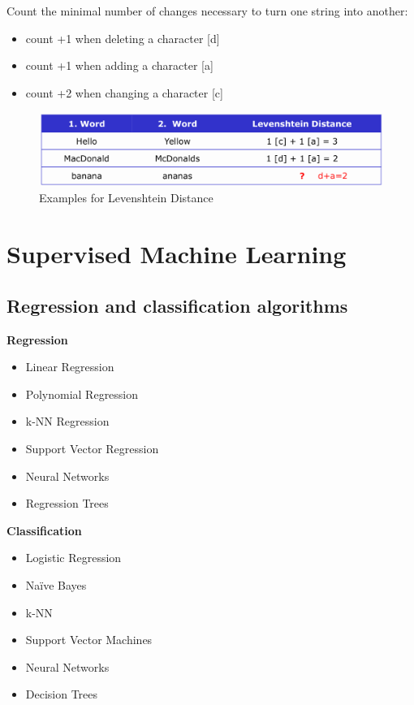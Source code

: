 \documentclass[a4paper, 11pt]{article}
\begin{document}
Count the minimal number of changes necessary to turn one string into another:
\begin{itemize}
    \item count +1 when deleting a character [d]
    \item count +1 when adding a character [a]
    \item count +2 when changing a character [c]
\end{itemize}

\begin{figure}[htb!]
    \centering
    \includegraphics[keepaspectratio=true, width=\linewidth]{levenshtein.png}
    \caption{Examples for Levenshtein Distance}
    \label{fig:levenshtein}
\end{figure}

\newpage

\section{Supervised Machine Learning}

\subsection{Regression and classification algorithms}

\begin{multicols}{2}
    \textbf{Regression}
    \begin{itemize}
        \item Linear Regression
        \item Polynomial Regression
        \item k-NN Regression
        \item Support Vector Regression
        \item Neural Networks
        \item Regression Trees
    \end{itemize}
    \columnbreak
    \textbf{Classification}
    \begin{itemize}
        \item Logistic Regression
        \item Naïve Bayes
        \item k-NN
        \item Support Vector Machines
        \item Neural Networks
        \item Decision Trees
    \end{itemize}
\end{multicols}
\end{document}
